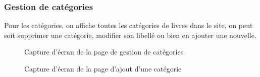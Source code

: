\subsubsection{Gestion de catégories}
Pour les catégories, on affiche toutes les catégories de livres dans le site, on peut soit supprimer une catégorie, modifier son libellé ou bien en ajouter une nouvelle.
\begin{figure}[H]
    \centering
    \caption{Capture d'écran de la page de gestion de catégories}
\end{figure}
\begin{figure}[H]
    \centering
    \caption{Capture d'écran de la page d'ajout d'une catégorie}
\end{figure}
